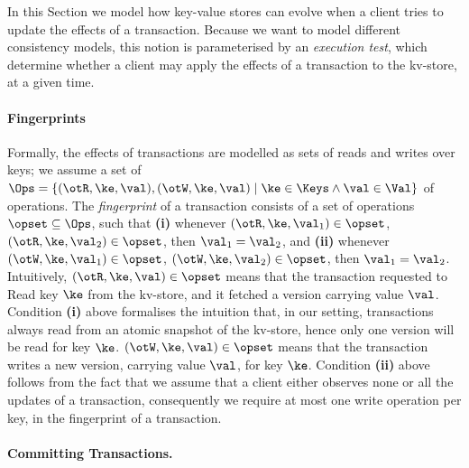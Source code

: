 In this Section we model how key-value stores can evolve when a client tries to update 
the effects of a transaction. Because we want to model different consistency models, 
this notion is parameterised by an \emph{execution test}, which determine whether 
a client may apply the effects of a transaction to the kv-store, at a given time.

\paragraph{Fingerprints} 
Formally, the effects of transactions are modelled as sets of reads and writes 
over keys; we assume a set of $\Ops = \{(\otR, \ke, \val), (\otW, \ke, \val) \mid \ke \in \Keys \wedge 
\val \in \Val \}$ of operations. The \emph{fingerprint} of a transaction consists of a 
set of operations $\opset \subseteq \Ops$, such that 
\textbf{(i)} whenever $(\otR, \ke, \val_1) \in \opset$, $(\otR, \ke, \val_2) \in \opset$, then $\val_1 = \val_2$, 
and \textbf{(ii)} whenever $(\otW, \ke, \val_1) \in \opset$, $(\otW, \ke, \val_2) \in \opset$, then $\val_1 = \val_2$. 
Intuitively, $(\otR, \ke, \val) \in \opset$ means that the transaction requested to \textsf{R}ead key $\ke$ from the kv-store, 
and it fetched a version carrying value $\val$. Condition \textbf{(i)} above formalises the intuition that, in our setting, 
transactions always read from an atomic snapshot of the kv-store, hence only one version will be read for key $\ke$. 
$(\otW, \ke, \val) \in \opset$ means that the transaction writes a new version, carrying value $\val$, for key $\ke$. 
Condition \textbf{(ii)} above follows from the fact that we assume that a client either observes none or all the updates 
of a transaction, consequently we require at most one write operation per key, in the fingerprint of a transaction. 

\paragraph{Committing Transactions.}


